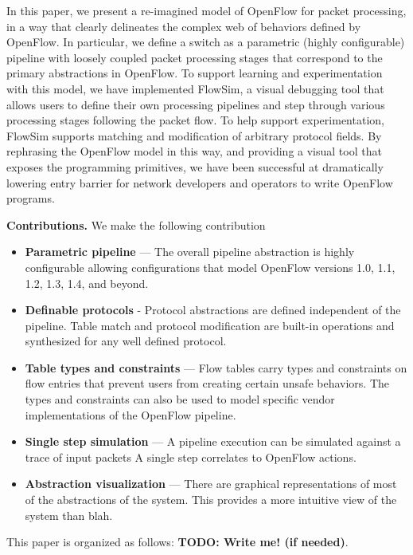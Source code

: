 In this paper, we present a re-imagined model of OpenFlow for
packet processing, in a way that clearly delineates the complex web of behaviors
defined by OpenFlow. In particular, we define a switch as a parametric (highly 
configurable) pipeline with loosely coupled packet processing stages that 
correspond to the primary abstractions in OpenFlow. To support learning and 
experimentation with this model, we have implemented FlowSim, a visual debugging
tool that allows users to define their own processing pipelines and step through
various processing stages following the packet flow. To help support 
experimentation, FlowSim supports matching and modification of arbitrary 
protocol fields. By rephrasing the OpenFlow model in this way, and providing a 
visual tool that exposes the programming primitives, we have been successful
at dramatically lowering entry barrier for network developers and operators to 
write OpenFlow programs.


\textbf{Contributions.} We make the following contribution
\begin{itemize}
  \item \textbf{Parametric pipeline} --- The overall pipeline abstraction is
        highly configurable allowing configurations that model OpenFlow 
        versions 1.0, 1.1, 1.2, 1.3, 1.4, and beyond.
  \item \textbf{Definable protocols} - Protocol abstractions are defined 
        independent of the pipeline. Table match and protocol modification are
        built-in operations and synthesized for any well defined protocol.
  \item \textbf{Table types and constraints} --- Flow tables carry types and
        constraints on flow entries that prevent users from creating certain
        unsafe behaviors. The types and constraints can also be used to model
        specific vendor implementations of the OpenFlow pipeline.
  \item \textbf{Single step simulation} --- A pipeline execution can be simulated
        against a trace of input packets A single step correlates to OpenFlow
        actions.
  \item \textbf{Abstraction visualization} --- There are graphical representations
        of most of the abstractions of the system. This provides a more intuitive
        view of the system than blah.
\end{itemize}

This paper is organized as follows: \textbf{TODO: Write me! (if needed)}.
